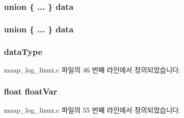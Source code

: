 \subsubsection[{\texorpdfstring{data}{data}}]{\setlength{\rightskip}{0pt plus 5cm}union \{ ... \}   data}\hypertarget{structlog__rt__queue__item__t_a22339528cfd7996fe83508f57491d554}{}\label{structlog__rt__queue__item__t_a22339528cfd7996fe83508f57491d554}
\subsubsection[{\texorpdfstring{data}{data}}]{\setlength{\rightskip}{0pt plus 5cm}union \{ ... \}   data}\hypertarget{structlog__rt__queue__item__t_a571028622b24ddadcaad61c08ac693ba}{}\label{structlog__rt__queue__item__t_a571028622b24ddadcaad61c08ac693ba}
\subsubsection[{\texorpdfstring{data\+Type}{dataType}}]{ data\+Type}\hypertarget{structlog__rt__queue__item__t_aed0db02095b8e7cd776304a6deb5e2ec}{}\label{structlog__rt__queue__item__t_aed0db02095b8e7cd776304a6deb5e2ec}


maap\+\_\+log\+\_\+linux.\+c 파일의 46 번째 라인에서 정의되었습니다.

\subsubsection[{\texorpdfstring{float\+Var}{floatVar}}]{\setlength{\rightskip}{0pt plus 5cm}float float\+Var}\hypertarget{structlog__rt__queue__item__t_a097418d0271cd5318e481be1ae56c841}{}\label{structlog__rt__queue__item__t_a097418d0271cd5318e481be1ae56c841}


maap\+\_\+log\+\_\+linux.\+c 파일의 55 번째 라인에서 정의되었습니다.

